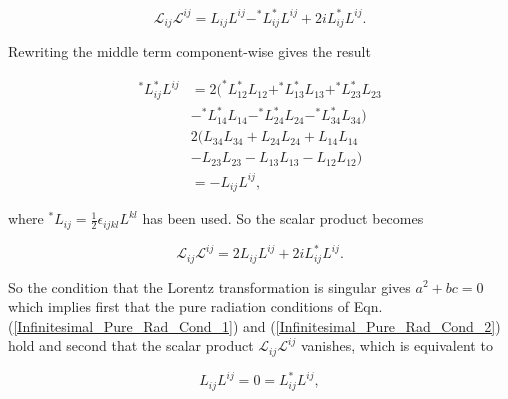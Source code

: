 \begin{appendix}
\begin{equation*}
\mathcal{L}_{ij} \mathcal{L}^{ij} = L_{ij}L^{ij} - ^{*}L_{ij}^{*}L^{ij} +2i L_{ij}^{*}L^{ij}.
\end{equation*}

\noindent Rewriting the middle term component-wise gives the result

\begin{align*}
^{*}L_{ij} ^{*}L^{ij} & = 2 ( ^{*}L_{12} ^{*}L_{12} + ^{*}L_{13} ^{*}L_{13} + ^{*}L_{23} ^{*}L_{23} \\
                      & - ^{*}L_{14} ^{*}L_{14} - ^{*}L_{24} ^{*}L_{24} - ^{*}L_{34} ^{*}L_{34}) \\
                      & 2( L_{34}L_{34} + L_{24}L_{24} + L_{14}L_{14} \\
                      & - L_{23}L_{23} - L_{13}L_{13} - L_{12}L_{12}) \\
                      & = - L_{ij}L^{ij},
\end{align*}

\noindent where $^{*}L_{ij} = \frac{1}{2} \epsilon_{ijkl}L^{kl}$ has been used. So the scalar product becomes

\begin{equation*}
\mathcal{L}_{ij} \mathcal{L}^{ij} = 2 L_{ij}L^{ij} + 2i L_{ij}^{*}L^{ij}.
\end{equation*}

\noindent So the condition that the Lorentz transformation is singular gives $a^2 + bc = 0$ which implies first that the pure radiation conditions of Eqn.(\ref{Infinitesimal_Pure_Rad_Cond_1}) and (\ref{Infinitesimal_Pure_Rad_Cond_2}) hold and second that the scalar product $\mathcal{L}_{ij} \mathcal{L}^{ij}$ vanishes, which is equivalent to 
   
\begin{equation*}
L_{ij}L^{ij} = 0 = L_{ij} ^{*}L^{ij},
\end{equation*}

\end{appendix}
